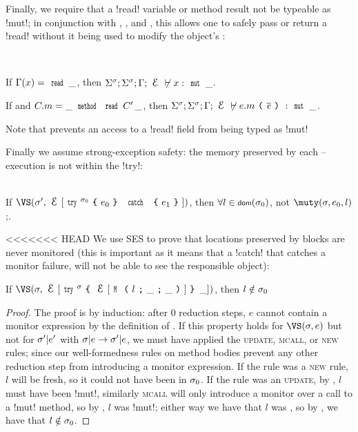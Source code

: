 \begin{Assumption}
\begin{Assumption}
\begin{Assumption}
\noindent Finally, we require that a \Q!read! variable or method result not be typeable as \Q!mut!; in conjunction with , , and , this allows one to safely pass or return a \Q!read! without it being used to modify the object's \rog:%
\SS\begin{Assumption}\rm\ 
\begin{ienumerate}
\item If $\G(x) = \Kw{read}\,\_$, then $\nty{x}{\Kw{mut}\,\_}$.
\item If  and $C.m = \_\,\Kw{method}\,\Kw{read}\,C'\,\_$, then $\nty{e.m\oR \es \cR}{\Kw{mut}\,\_}$.
\end{ienumerate}
\noindent Note that  prevents an access to a \Q!read! field from being typed as \Q!mut!
\end{Assumption}\SS

Finally we assume strong-exception safety: the memory preserved by each \Q@try@--\Q@catch@ execution is not \muty within the \Q!try!:%
\SS\begin{Assumption}[Strong Exception Safety]\rm\ \\
\indent If $\VS(\s', \E[\Kw{try}^{\s_0}\oC e_0\cC\ \Kw{catch}\ \oC e_1\cC])$, then $\forall l \in \dom(\s_0)$, not $\muty(\s, e_0, l)$;.
\end{Assumption}

<<<<<<< HEAD
We use SES to prove that locations preserved by \Q@try@ blocks are never monitored (this is important as it means that a \Q!catch! that catches a monitor failure, will not be able to see the responsible object):%
\SS\begin{Lemma}[Unmonitored Try]\rm
	If $\VS(\s, \E[\Kw{try}^\s\oC\E[\M{l}{\_}{\_}]\cC\,\_])$, then $l\notin\sigma_0$
\end{Lemma}\SS
\begin{proof}
The proof is by induction: after 0 reduction steps, $e$ cannot contain a monitor expression by the definition of \VS. If this property holds for $\VS(\s, e)$ but not for $\sigma'|e'$ with $\sigma|e\rightarrow \sigma'|e$, we must have applied the \textsc{update}, \textsc{mcall}, or \textsc{new} rules; since our well-formedness rules on method bodies prevent any other reduction step from introducing a monitor expression. If the rule was a \textsc{new} rule, $l$ will be fresh, so it could not have been in $\sigma_0$. If the rule was an \textsc{update}, by , $l$ must have been \Q!mut!, similarly \textsc{mcall} will only introduce a monitor over a call to a \Q!mut! method, so by , $l$ was \Q!mut!; either way we have that $l$ was \muty, so by , we have that $l \notin \sigma_0$.
\end{proof}


\end{Assumption}
\end{Assumption}
\end{Assumption}

